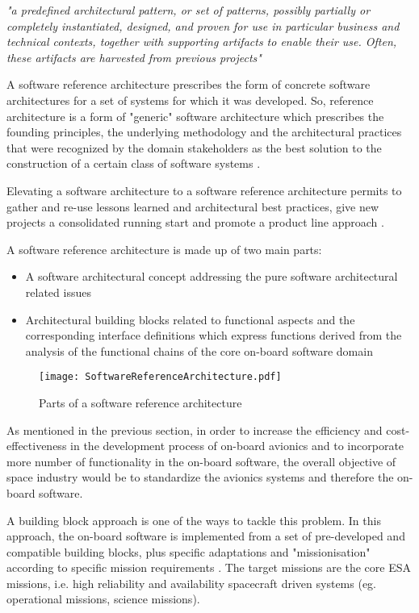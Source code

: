 \textit{"a predefined architectural pattern, or set of patterns, possibly partially or
completely instantiated, designed, and proven for use in particular business and technical contexts, together with supporting artifacts to enable their use. Often, these artifacts are harvested
from previous projects"} 

A software reference architecture prescribes the form of concrete software architectures for a set of systems for which it was developed. So, reference architecture is a form of "generic" software architecture which prescribes the founding principles, the underlying methodology and the architectural practices that were recognized by the domain stakeholders as the best solution to the construction of a certain class of software systems \cite{PhdThesis,SoftRefArch}.

Elevating a software architecture to a software reference architecture permits to gather and re-use lessons learned and architectural best practices, give new projects a consolidated running start and promote a product line approach \cite{SAVOIR}.

A software reference architecture is made up of two main parts: \cite{SAVOIR}

\begin{itemize}
\item A software architectural concept addressing the pure software architectural related issues
\item Architectural building blocks related to functional aspects and the corresponding interface definitions which express functions derived from the analysis of the functional chains of the core on-board software domain 
\end{itemize}

\begin{figure}[h]
	\centering
	\texttt{[image: SoftwareReferenceArchitecture.pdf]}
	\caption{Parts of a software reference architecture}
	\label{}
\end{figure} 

As mentioned in the previous section, in order to increase the efficiency and cost-effectiveness in the development process of on-board avionics and to incorporate more number of functionality in the on-board software, the overall objective of space industry would be to standardize the avionics systems and therefore the on-board software.

A building block approach is one of the ways to tackle this problem. In this approach, the on-board software is implemented from a set of pre-developed and compatible building blocks, plus specific adaptations and "missionisation" according to specific mission requirements \cite{SAVOIR}. The target missions are the core ESA missions, i.e. high reliability and availability spacecraft driven systems (eg. operational missions, science missions).

